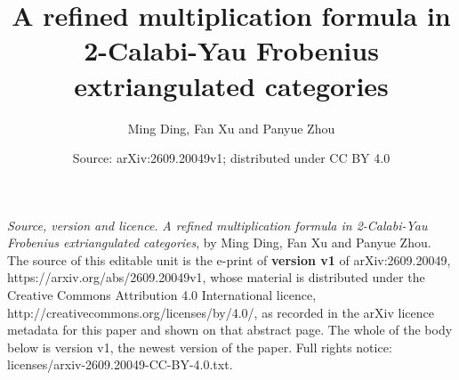 \documentclass[10pt,a4paper]{amsart}
\numberwithin{equation}{section}
\theoremstyle{definition}
\begin{document}
\title{A refined multiplication formula in 2-Calabi-Yau Frobenius extriangulated categories}
\author{Ming Ding, Fan Xu and Panyue Zhou}
\date{Source: arXiv:2609.20049v1; distributed under CC BY 4.0}
\maketitle
\noindent\emph{Source, version and licence.} \emph{A refined multiplication formula in 2-Calabi-Yau Frobenius extriangulated categories}, by Ming Ding, Fan Xu and Panyue Zhou. The source of this editable unit is the e-print of \textbf{version v1} of arXiv:2609.20049, https://arxiv.org/abs/2609.20049v1, whose material is distributed under the Creative Commons Attribution 4.0 International licence, http://creativecommons.org/licenses/by/4.0/, as recorded in the arXiv licence metadata for this paper and shown on that abstract page. The whole of the body below is version v1, the newest version of the paper. Full rights notice: licenses/arxiv-2609.20049-CC-BY-4.0.txt.\par\smallskip
\end{document}
